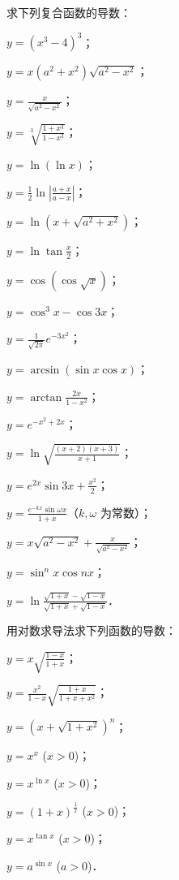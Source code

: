 \begin{xiti}
\item 求下列复合函数的导数：
\begin{ziti}
\item $y = (x^3 - 4)^3$；
\item $y = x(a^2 + x^2)\sqrt{a^2 - x^2}$；
\item $y = \frac{x}{\sqrt{a^2 - x^2}}$；
\item $y = \sqrt[3]{\frac{1 + x^3}{1 - x^3}}$；
\item $y = \ln(\ln x)$；
\item $y = \frac{1}{2}\ln\left|\frac{a+x}{a-x}\right|$；
\item $y = \ln\left(x + \sqrt{a^2 + x^2}\right)$；
\item $y = \ln\tan\frac{x}{2}$；
\item $y = \cos(\cos\sqrt{x})$；
\item $y = \cos^3 x - \cos 3x$；
\item $y = \frac{1}{\sqrt{2\pi}}e^{-3x^2}$；
\item $y = \arcsin(\sin x \cos x)$；
\item $y = \arctan\frac{2x}{1-x^2}$；
\item $y = e^{-x^2 + 2x}$；
\item $y = \ln\sqrt{\frac{(x+2)(x+3)}{x+1}}$；
\item $y = e^{2x}\sin 3x + \frac{x^2}{2}$；
\item $y = \frac{e^{-kx}\sin \omega x}{1+x}$（$k, \omega$ 为常数）；
\item $y = x\sqrt{a^2 - x^2} + \frac{x}{\sqrt{a^2 - x^2}}$；
\item $y = \sin^n x \cos nx$；
\item $y = \ln\frac{\sqrt{1+x} - \sqrt{1-x}}{\sqrt{1+x} + \sqrt{1-x}}$．
\end{ziti}

\item 用对数求导法求下列函数的导数：
\begin{ziti}
\item $y = x\sqrt{\frac{1-x}{1+x}}$；
\item $y = \frac{x^2}{1-x}\sqrt{\frac{1+x}{1+x+x^2}}$；
\item $y = (x + \sqrt{1+x^2})^n$；
\item $y = x^x$ ($x > 0$)；
\item $y = x^{\ln x}$ ($x > 0$)；
\item $y = (1+x)^{\frac{1}{x}}$ ($x > 0$)；
\item $y = x^{\tan x}$ ($x > 0$)；
\item $y = a^{\sin x}$ ($a > 0$)．
\end{ziti}


\end{xiti}
